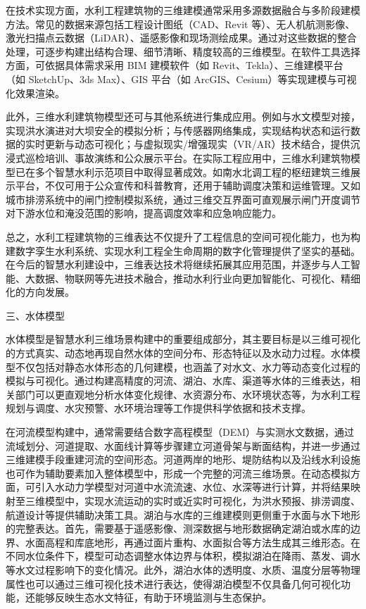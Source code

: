 在技术实现方面，水利工程建筑物的三维建模通常采用多源数据融合与多阶段建模方法。常见的数据来源包括工程设计图纸（CAD、Revit 等）、无人机航测影像、激光扫描点云数据（LiDAR）、遥感影像和现场测绘成果。通过对这些数据的整合处理，可逐步构建出结构合理、细节清晰、精度较高的三维模型。在软件工具选择方面，可依据具体需求采用 BIM 建模软件（如 Revit、Tekla）、三维建模平台（如 SketchUp、3ds Max）、GIS 平台（如 ArcGIS、Cesium）等实现建模与可视化效果渲染。

此外，三维水利建筑物模型还可与其他系统进行集成应用。例如与水文模型对接，实现洪水演进对大坝安全的模拟分析；与传感器网络集成，实现结构状态和运行数据的实时更新与动态可视化；与虚拟现实/增强现实（VR/AR）技术结合，提供沉浸式巡检培训、事故演练和公众展示平台。在实际工程应用中，三维水利建筑物模型已在多个智慧水利示范项目中取得显著成效。如南水北调工程的枢纽建筑三维展示平台，不仅可用于公众宣传和科普教育，还用于辅助调度决策和运维管理。又如城市排涝系统中的闸门控制模拟系统，通过三维交互界面可直观展示闸门开度调节对下游水位和淹没范围的影响，提高调度效率和应急响应能力。

总之，水利工程建筑物的三维表达不仅提升了工程信息的空间可视化能力，也为构建数字孪生水利系统、实现水利工程全生命周期的数字化管理提供了坚实的基础。在今后的智慧水利建设中，三维表达技术将继续拓展其应用范围，并逐步与人工智能、大数据、物联网等先进技术融合，推动水利行业向更加智能化、可视化、精细化的方向发展。

三、水体模型

水体模型是智慧水利三维场景构建中的重要组成部分，其主要目标是以三维可视化的方式真实、动态地再现自然水体的空间分布、形态特征以及水动力过程。水体模型不仅包括对静态水体形态的几何建模，也涵盖了对水文、水力等动态变化过程的模拟与可视化。通过构建高精度的河流、湖泊、水库、渠道等水体的三维表达，相关部门可以更直观地分析水体变化规律、水资源分布、水环境状态等，为水利工程规划与调度、水灾预警、水环境治理等工作提供科学依据和技术支撑。

在河流模型构建中，通常需要结合数字高程模型（DEM）与实测水文数据，通过流域划分、河道提取、水面线计算等步骤建立河道骨架与断面结构，并进一步通过三维建模手段重建河流的空间形态。河道两岸的地形、堤防结构以及沿线水利设施也可作为辅助要素加入整体模型中，形成一个完整的河流三维场景。在动态模拟方面，可引入水动力学模型对河道中水流流速、水位、水深等进行计算，并将结果映射至三维模型中，实现水流运动的实时或近实时可视化，为洪水预报、排涝调度、航道设计等提供辅助决策工具。湖泊与水库的三维建模则更侧重于水面与水下地形的完整表达。首先，需要基于遥感影像、测深数据与地形数据确定湖泊或水库的边界、水面高程和库底地形，再通过面片重构、水面拟合等方法生成其三维形态。在不同水位条件下，模型可动态调整水体边界与体积，模拟湖泊在降雨、蒸发、调水等水文过程影响下的变化情况。此外，湖泊水体的透明度、水质、温度分层等物理属性也可以通过三维可视化技术进行表达，使得湖泊模型不仅具备几何可视化功能，还能够反映生态水文特征，有助于环境监测与生态保护。

